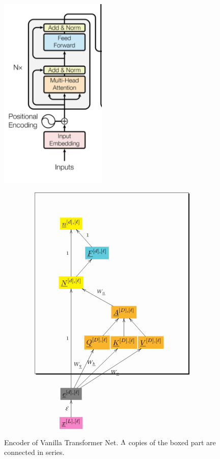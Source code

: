 \begin{figure}[h!]\centering
\begin{minipage}{.4\linewidth}
\includegraphics[width=2in]{transformer/encoder.jpg}
\end{minipage}%
\begin{minipage}{.6\linewidth}
$$\xymatrix@R=2pc@C=0.1pc{
*+[F*:yellow]{\underline{n}^{[d], [\ell]}}&&&
\\
&*+[F*:SkyBlue]{\underline{F}^{[d], [\ell]}}\ar[ul]_{1}&&
\\
*+[F*:yellow]{\underline{N}^{[d], [\ell]}}\ar[ur]\ar[uu]^{1}&&&
\\
&&*+[F*:Dandelion]{\underline{A}^{[D], [\ell]}}\ar[ull]_{W_\rva}&
\\
&*+[F*:Dandelion]{\underline{Q}^{[D], [\ell]}}\ar[ur]&*+[F*:Dandelion]{\underline{K}^{[D], [\ell]}}\ar[u]&*+[F*:Dandelion]{\underline{V}^{[D], [\ell]}}\ar[ul]
\\
&&&
\\
*+[F*:gray]{\underline{e}^{[d], [\ell]}}\ar[uurr]^{W_\rvk}\ar[uuuu]^{1}\ar[uur]^{W_\rvq}\ar[uurrr]_{W_\rvv}&&&
\\
*+[F*:Lavender]{\underline{x}^{[L],[\ell]}}\ar[u]^{\cale}&&&
\save
\POS"1,1"."5,1"."1,4"."5,4"!C*+<7.0em>\frm{-,}
\restore
}$$
\end{minipage}
\caption{Encoder of Vanilla Transformer Net. $\Lambda$ copies of the boxed part are connected in series.}
\label{fig-texnn-for-encoder}
\end{figure}

